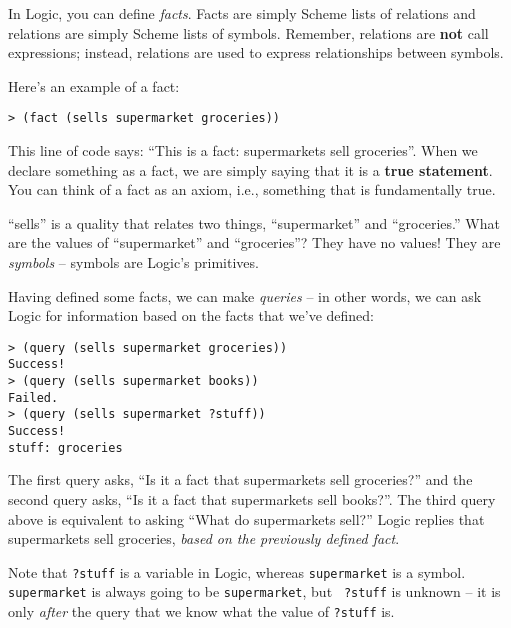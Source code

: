 In Logic, you can define \textit{facts}. Facts are simply Scheme lists of
relations and relations are simply Scheme lists of symbols. Remember, relations
are {\bf not} call expressions; instead, relations are used to express
relationships between symbols.

Here's an example of a fact:

\begin{lstlisting}
> (fact (sells supermarket groceries))
\end{lstlisting}

This line of code says: ``This is a fact: supermarkets sell groceries''. When we
declare something as a fact, we are simply saying that it is a \textbf{true
statement}.  You can think of a fact as an axiom, i.e., something that is
fundamentally true.

``sells'' is a quality that relates two things, ``supermarket'' and
``groceries.''  What are the values of ``supermarket'' and ``groceries''? They
have no values! They are \textit{symbols} -- symbols are Logic's primitives.

Having defined some facts, we can make \textit{queries} -- in other words, we
can ask Logic for information based on the facts that we've defined:

\begin{lstlisting}
> (query (sells supermarket groceries))
Success!
> (query (sells supermarket books))
Failed.
> (query (sells supermarket ?stuff))
Success!
stuff: groceries
\end{lstlisting}

The first query asks, ``Is it a fact that supermarkets sell groceries?'' and the
second query asks, ``Is it a fact that supermarkets sell books?''.  The third
query above is equivalent to asking ``What do supermarkets sell?'' Logic replies
that supermarkets sell groceries, \textit{based on the previously defined fact}.

Note that {\tt ?stuff} is a variable in Logic, whereas {\tt supermarket} is a
symbol.  {\tt supermarket} is always going to be {\tt supermarket}, but {\tt
?stuff} is unknown -- it is only \textit{after} the query that we know what the
value of {\tt ?stuff} is.





